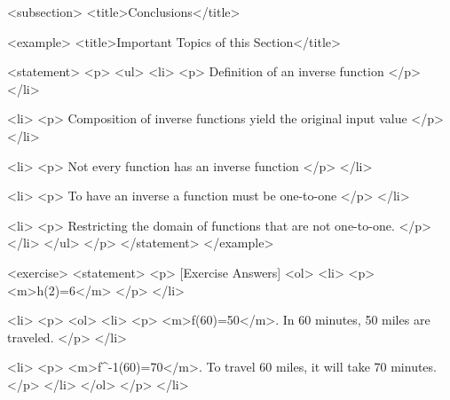     <subsection>
        <title>Conclusions</title>

        <example>
            <title>Important Topics of this Section</title>

            <statement>
                <p>
                    <ul>
                        <li>
                            <p>
                                Definition of an inverse function
                            </p>
                        </li>

                        <li>
                            <p>
                                Composition of inverse functions yield the original input value
                            </p>
                        </li>

                        <li>
                            <p>
                                Not every function has an inverse function
                            </p>
                        </li>

                        <li>
                            <p>
                                To have an inverse a function must be one-to-one
                            </p>
                        </li>

                        <li>
                            <p>
                                Restricting the domain of functions that are not one-to-one.
                            </p>
                        </li>
                    </ul>
                </p>
            </statement>
        </example>

        <exercise>
            <statement>
                <p>
                    [Exercise Answers]
                    <ol>
                        <li>
                            <p>
                                <m>h(2)=6</m>
                            </p>
                        </li>

                        <li>
                            <p>
                                <ol>
                                    <li>
                                        <p>
                                            <m>f(60)=50</m>. In 60 minutes, 50 miles are traveled.
                                        </p>
                                    </li>

                                    <li>
                                        <p>
                                            <m>f^{-1}(60)=70</m>. To travel 60 miles, it will take 70 minutes.
                                        </p>
                                    </li>
                                </ol>
                            </p>
                        </li>

